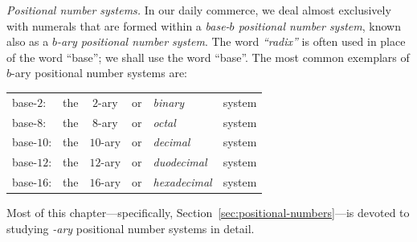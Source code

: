 
\noindent
{\it Positional number systems.}
In our daily commerce, we deal almost exclusively with numerals that are formed within a {\it base-$b$ positional number system},  known also as a {\it $b$-ary positional number system}.
The word {\it ``radix''} is often used in place of the word ``base''; we shall use the word ``base''.  The most common exemplars of $b$-ary positional number systems are:

\smallskip

\begin{tabular}{llclll}
base-$2$:  & the & $2$-ary  & or & {\em binary}      & system \\
base-$8$:  & the & $8$-ary  & or & {\em octal}       & system \\
base-$10$: & the & $10$-ary & or & {\em decimal}     & system \\
base-$12$: & the & $12$-ary & or & {\em duodecimal}  & system \\
base-$16$: & the & $16$-ary & or & {\em hexadecimal} & system
\end{tabular}

\smallskip

\noindent
Most of this chapter---specifically, Section~\ref{sec:positional-numbers}---is devoted to studying {\em -ary} positional number systems in detail.

\medskip


